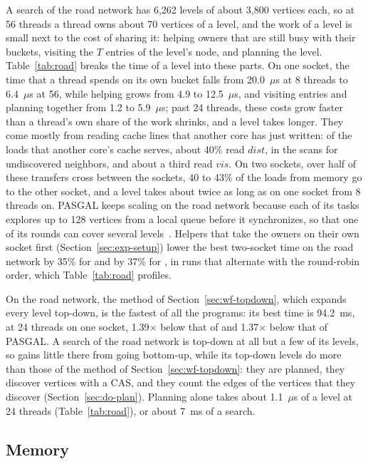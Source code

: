 A search of the road network has 6,262 levels of about 3,800 vertices each, so at 56 threads a thread owns about 70 vertices of a level, and the work of a level is small next to the cost of sharing it: helping owners that are still busy with their buckets, visiting the $T$ entries of the level's node, and planning the level. Table~\ref{tab:road} breaks the time of a level into these parts. On one socket, the time that a thread spends on its own bucket falls from 20.0~$\mu$s at 8 threads to 6.4~$\mu$s at 56, while helping grows from 4.9 to 12.5~$\mu$s, and visiting entries and planning together from 1.2 to 5.9~$\mu$s; past 24 threads, these costs grow faster than a thread's own share of the work shrinks, and a level takes longer. They come mostly from reading cache lines that another core has just written: of the loads that another core's cache serves, about 40\% read $\mathit{dist}$, in the scans for undiscovered neighbors, and about a third read $\mathit{vis}$. On two sockets, over half of these transfers cross between the sockets, 40 to 43\% of the loads from memory go to the other socket, and a level takes about twice as long as on one socket from 8 threads on. PASGAL keeps scaling on the road network because each of its tasks explores up to 128 vertices from a local queue before it synchronizes, so that one of its rounds can cover several levels~\cite{pasgal, vgc_hashbag}. Helpers that take the owners on their own socket first (Section~\ref{sec:exp-setup}) lower the best two-socket time on the road network by 35\% for \wfdo and by 37\% for \wfdomem, in runs that alternate with the round-robin order, which Table~\ref{tab:road} profiles.

On the road network, the method of Section~\ref{sec:wf-topdown}, which expands every level top-down, is the fastest of all the programs: its best time is 94.2~ms, at 24 threads on one socket, 1.39$\times$ below that of \wfdo and 1.37$\times$ below that of PASGAL. A search of the road network is top-down at all but a few of its levels, so \wfdo gains little there from going bottom-up, while its top-down levels do more than those of the method of Section~\ref{sec:wf-topdown}: they are planned, they discover vertices with a CAS, and they count the edges of the vertices that they discover (Section~\ref{sec:do-plan}). Planning alone takes about 1.1~$\mu$s of a level at 24 threads (Table~\ref{tab:road}), or about 7~ms of a search.

\subsection{Memory}
\label{sec:exp-memory}

